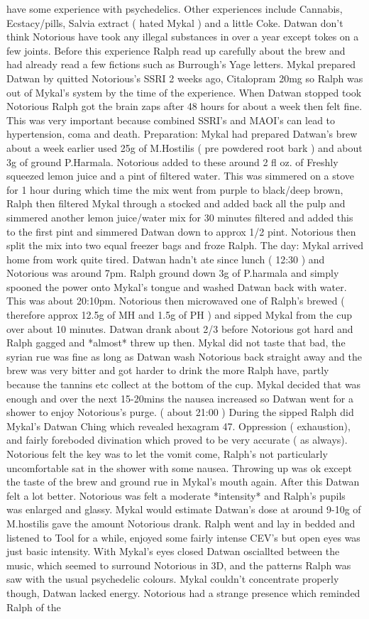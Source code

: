 \documentclass[12pt]{book}
\begin{document}
have some experience with psychedelics. Other experiences include Cannabis, Ecstacy/pills, Salvia extract ( hated Mykal ) and a little Coke. Datwan don't think Notorious have took any illegal substances in over a year except tokes on a few joints. Before this experience Ralph read up carefully about the brew and had already read a few fictions such as Burrough's Yage letters. Mykal prepared Datwan by quitted Notorious's SSRI 2 weeks ago, Citalopram 20mg so Ralph was out of Mykal's system by the time of the experience. When Datwan stopped took Notorious Ralph got the brain zaps after 48 hours for about a week then felt fine. This was very important because combined SSRI's and MAOI's can lead to hypertension, coma and death. Preparation: Mykal had prepared Datwan's brew about a week earlier used 25g of M.Hostilis ( pre powdered root bark ) and about 3g of ground P.Harmala. Notorious added to these around 2 fl oz. of Freshly squeezed lemon juice and a pint of filtered water. This was simmered on a stove for 1 hour during which time the mix went from purple to black/deep brown, Ralph then filtered Mykal through a stocked and added back all the pulp and simmered another lemon juice/water mix for 30 minutes filtered and added this to the first pint and simmered Datwan down to approx 1/2 pint. Notorious then split the mix into two equal freezer bags and froze Ralph. The day: Mykal arrived home from work quite tired. Datwan hadn't ate since lunch ( 12:30 ) and Notorious was around 7pm. Ralph ground down 3g of P.harmala and simply spooned the power onto Mykal's tongue and washed Datwan back with water. This was about 20:10pm. Notorious then microwaved one of Ralph's brewed ( therefore approx 12.5g of MH and 1.5g of PH ) and sipped Mykal from the cup over about 10 minutes. Datwan drank about 2/3 before Notorious got hard and Ralph gagged and *almost* threw up then. Mykal did not taste that bad, the syrian rue was fine as long as Datwan wash Notorious back straight away and the brew was very bitter and got harder to drink the more Ralph have, partly because the tannins etc collect at the bottom of the cup. Mykal decided that was enough and over the next 15-20mins the nausea increased so Datwan went for a shower to enjoy Notorious's purge. ( about 21:00 ) During the sipped Ralph did Mykal's Datwan Ching which revealed hexagram 47. Oppression ( exhaustion), and fairly foreboded divination which proved to be very accurate ( as always). Notorious felt the key was to let the vomit come, Ralph's not particularly uncomfortable sat in the shower with some nausea. Throwing up was ok except the taste of the brew and ground rue in Mykal's mouth again. After this Datwan felt a lot better. Notorious was felt a moderate *intensity* and Ralph's pupils was enlarged and glassy. Mykal would estimate Datwan's dose at around 9-10g of M.hostilis gave the amount Notorious drank. Ralph went and lay in bedded and listened to Tool for a while, enjoyed some fairly intense CEV's but open eyes was just basic intensity. With Mykal's eyes closed Datwan osciallted between the music, which seemed to surround Notorious in 3D, and the patterns Ralph was saw with the usual psychedelic colours. Mykal couldn't concentrate properly though, Datwan lacked energy. Notorious had a strange presence which reminded Ralph of the 
\end{document}

